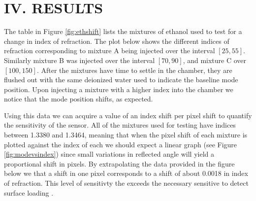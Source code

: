\section*{IV. RESULTS}
\label{sec:results}
\hspace{0.25in}
The table in Figure \ref{fig:ethshift} lists the mixtures of ethanol used to test for a change in index of refraction. The plot below shows the different indices of refraction corresponding to mixture A being injected over the interval $[25, 55]$. Similarly mixture B was injected over the interval $[70, 90]$, and mixture C over $[100, 150]$. After the mixtures have time to settle in the chamber, they are flushed out with the same deionized water used to indicate the baseline mode position. Upon injecting a mixture with a higher index into the chamber we notice that the mode position shifts, as expected. 


\hspace{0.1in}
Using this data we can acquire a value of an index shift per pixel shift to quantify the sensitivity of the sensor. All of the mixtures used for testing have indices between 1.3380 and 1.3464, meaning that when the pixel shift of each mixture is plotted against the index of each we should expect a linear graph (see Figure \ref{fig:modevsindex}) since small variations in reflected angle will yield a proportional shift in pixels.
By extrapolating the data provided in the figure below we that a shift in one pixel corresponds to a shift of about 0.0018 in index of refraction. This level of sensitivty the exceeds the necessary sensitive to detect surface loading \cite{roberstonpaper}.

